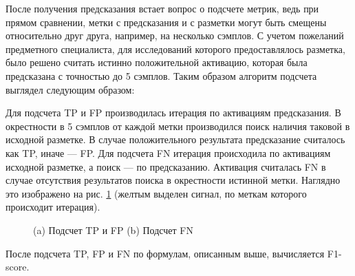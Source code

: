 После получения предсказания встает вопрос о подсчете метрик, ведь при прямом
сравнении, метки с предсказания и с разметки могут быть смещены относительно
друг друга, например, на несколько сэмплов. С учетом пожеланий предметного
специалиста, для исследований которого предоставлялось разметка, было решено
считать истинно положительной активацию, которая была предсказана с точностью
до 5 сэмплов. Таким образом алгоритм подсчета выглядел следующим образом:

Для подсчета TP и FP производилась итерация по активациям предсказания. В
окрестности в 5 сэмплов от каждой метки производился поиск наличия таковой в
исходной разметке. В случае положительного результата предсказание считалось
как TP, иначе --- FP. Для подсчета FN итерация происходила по активациям исходной
разметке, а поиск --- по предсказанию. Активация считалась FN в случае
отсутствия результатов поиска в окрестности истинной метки. Наглядно это
изображено на рис. \ref{fig:metrics} (желтым выделен сигнал, по меткам которого
происходит итерация).

\begin{figure}[!htb]
	\centering
	\label{fig:metrics}
	\caption{(a) Подсчет TP и FP (b) Подсчет FN}
\end{figure}

После подсчета TP, FP и FN по формулам, описанным выше, вычисляется F1-score.
